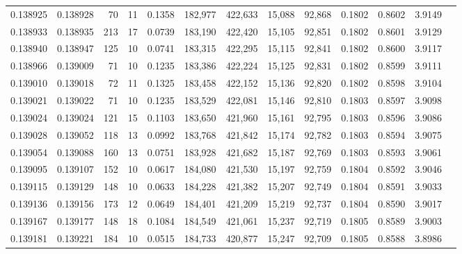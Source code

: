 \begin{tabular}{rrrrrrrrrrrrr}
0.138925 & 0.138928 &    70 &  11 &                                     0.1358 & 182,977 & 422,633 &  15,088 &  92,868 & 0.1802 & 0.8602 & 3.9149 \\
0.138933 & 0.138935 &   213 &  17 &                                     0.0739 & 183,190 & 422,420 &  15,105 &  92,851 & 0.1802 & 0.8601 & 3.9129 \\
0.138940 & 0.138947 &   125 &  10 &                                     0.0741 & 183,315 & 422,295 &  15,115 &  92,841 & 0.1802 & 0.8600 & 3.9117 \\
0.138966 & 0.139009 &    71 &  10 &                                     0.1235 & 183,386 & 422,224 &  15,125 &  92,831 & 0.1802 & 0.8599 & 3.9111 \\
0.139010 & 0.139018 &    72 &  11 &                                     0.1325 & 183,458 & 422,152 &  15,136 &  92,820 & 0.1802 & 0.8598 & 3.9104 \\
0.139021 & 0.139022 &    71 &  10 &                                     0.1235 & 183,529 & 422,081 &  15,146 &  92,810 & 0.1803 & 0.8597 & 3.9098 \\
0.139024 & 0.139024 &   121 &  15 &                                     0.1103 & 183,650 & 421,960 &  15,161 &  92,795 & 0.1803 & 0.8596 & 3.9086 \\
0.139028 & 0.139052 &   118 &  13 &                                     0.0992 & 183,768 & 421,842 &  15,174 &  92,782 & 0.1803 & 0.8594 & 3.9075 \\
0.139054 & 0.139088 &   160 &  13 &                                     0.0751 & 183,928 & 421,682 &  15,187 &  92,769 & 0.1803 & 0.8593 & 3.9061 \\
0.139095 & 0.139107 &   152 &  10 &                                     0.0617 & 184,080 & 421,530 &  15,197 &  92,759 & 0.1804 & 0.8592 & 3.9046 \\
0.139115 & 0.139129 &   148 &  10 &                                     0.0633 & 184,228 & 421,382 &  15,207 &  92,749 & 0.1804 & 0.8591 & 3.9033 \\
0.139136 & 0.139156 &   173 &  12 &                                     0.0649 & 184,401 & 421,209 &  15,219 &  92,737 & 0.1804 & 0.8590 & 3.9017 \\
0.139167 & 0.139177 &   148 &  18 &                                     0.1084 & 184,549 & 421,061 &  15,237 &  92,719 & 0.1805 & 0.8589 & 3.9003 \\
0.139181 & 0.139221 &   184 &  10 &                                     0.0515 & 184,733 & 420,877 &  15,247 &  92,709 & 0.1805 & 0.8588 & 3.8986 \\

\end{tabular}
